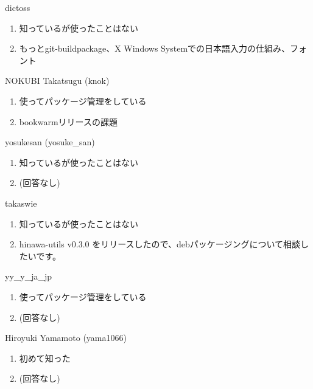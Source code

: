 \begin{prework}{ dictoss }
  \begin{enumerate}
  \item 知っているが使ったことはない
  \item もっとgit-buildpackage、X Windows Systemでの日本語入力の仕組み、フォント
  \end{enumerate}
\end{prework}

\begin{prework}{ NOKUBI Takatsugu (knok) }
  \begin{enumerate}
  \item 使ってパッケージ管理をしている
  \item bookwarmリリースの課題
  \end{enumerate}
\end{prework}

\begin{prework}{ yosukesan (yosuke\_san) }
  \begin{enumerate}
  \item 知っているが使ったことはない
  \item (回答なし)
  \end{enumerate}
\end{prework}

\begin{prework}{ takaswie }
  \begin{enumerate}
  \item 知っているが使ったことはない
  \item hinawa-utils v0.3.0 をリリースしたので、debパッケージングについて相談したいです。
  \end{enumerate}
\end{prework}

\begin{prework}{ yy\_y\_ja\_jp }
  \begin{enumerate}
  \item 使ってパッケージ管理をしている
  \item (回答なし)
  \end{enumerate}
\end{prework}

\begin{prework}{ Hiroyuki Yamamoto (yama1066) }
  \begin{enumerate}
  \item 初めて知った
  \item (回答なし)
  \end{enumerate}
\end{prework}

